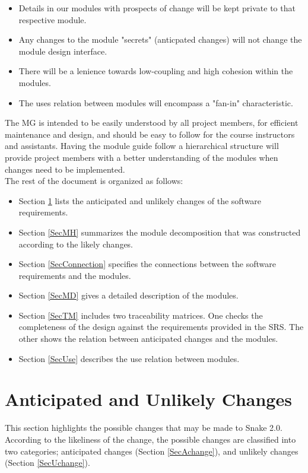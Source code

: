 \documentclass[12pt, titlepage]{article}
\begin{document}
\begin{itemize}
\item Details in our modules with prospects of change will be kept private to that respective module. 
\item Any changes to the module "secrets" (anticpated changes) will not change the module design interface.
\item There will be a lenience towards low-coupling and high cohesion within the modules.
\item The uses relation between modules will encompass a "fan-in" characteristic.
\end{itemize}

The MG is intended to be easily understood by all project members, for efficient maintenance and design, and should be easy to follow for the course instructors and assistants. Having the module guide follow a hierarchical structure will provide project members with a better understanding of the modules when changes need to be implemented.\\

The rest of the document is organized as follows:
\begin{itemize}
\item Section \ref{SecChange} lists the anticipated and unlikely changes of the software requirements. 
\item Section \ref{SecMH} summarizes the module decomposition that was constructed according to the likely changes. 
\item Section \ref{SecConnection} specifies the connections between the software requirements and the modules. 
\item Section \ref{SecMD} gives a detailed description of the modules. 
\item Section \ref{SecTM} includes two traceability matrices. One checks the completeness of the design against the requirements provided in the SRS. The
other shows the relation between anticipated changes and the modules. 
\item Section \ref{SecUse} describes the use relation between modules.
\end{itemize}

\section{Anticipated and Unlikely Changes} \label{SecChange}

This section highlights the possible changes that may be made to Snake 2.0. According to the likeliness
of the change, the possible changes are classified into two
categories; anticipated changes (Section \ref{SecAchange}), and
unlikely changes (Section \ref{SecUchange}).
\end{document}
